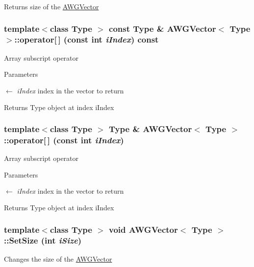 \begin{DoxyReturn}{Returns}
size of the \hyperlink{classAWGVector}{AWGVector} 
\end{DoxyReturn}
\hypertarget{classAWGVector_aa6059d1f2e2d2e531a1fce5a03235175}{
\subsubsection[{operator[]}]{\setlength{\rightskip}{0pt plus 5cm}template$<$class Type $>$ const Type \& {\bf AWGVector}$<$ Type $>$::operator\mbox{[}$\,$\mbox{]} (const int {\em iIndex}) const}}
\label{classAWGVector_aa6059d1f2e2d2e531a1fce5a03235175}
Array subscript operator


\begin{DoxyParams}{Parameters}
\item[\mbox{$\leftarrow$} {\em iIndex}]index in the vector to return \end{DoxyParams}
\begin{DoxyReturn}{Returns}
Type object at index iIndex 
\end{DoxyReturn}
\hypertarget{classAWGVector_ac77f482986aaecdb71e4f2601e4836a7}{
\subsubsection[{operator[]}]{\setlength{\rightskip}{0pt plus 5cm}template$<$class Type $>$ Type \& {\bf AWGVector}$<$ Type $>$::operator\mbox{[}$\,$\mbox{]} (const int {\em iIndex})}}
\label{classAWGVector_ac77f482986aaecdb71e4f2601e4836a7}
Array subscript operator


\begin{DoxyParams}{Parameters}
\item[\mbox{$\leftarrow$} {\em iIndex}]index in the vector to return \end{DoxyParams}
\begin{DoxyReturn}{Returns}
Type object at index iIndex 
\end{DoxyReturn}
\hypertarget{classAWGVector_a0f4ea8cfdf8ae589597e2b347d8f6e61}{
\subsubsection[{SetSize}]{\setlength{\rightskip}{0pt plus 5cm}template$<$class Type $>$ void {\bf AWGVector}$<$ Type $>$::SetSize (int {\em iSize})}}
\label{classAWGVector_a0f4ea8cfdf8ae589597e2b347d8f6e61}
Changes the size of the \hyperlink{classAWGVector}{AWGVector}


